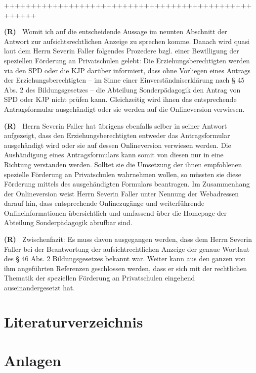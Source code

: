 \documentclass[paper=a4,fontsize=12pt, oneside, numbers=noenddot]{scrbook}
\newcounter{rz}
\newcommand{\Rz}{
	\addtocounter{rz}{1}\textbf{(R\arabic{rz})~}
}
\begin{document}
++++++++++++++++++++++++++++++++++++++++++++++++++++

\Rz Womit ich auf die entscheidende Aussage im neunten Abschnitt der Antwort zur aufsichtsrechtlichen Anzeige zu sprechen komme. Danach wird quasi laut dem Herrn Severin Faller folgendes Prozedere bzgl. einer Bewilligung der speziellen Förderung an Privatschulen gelebt: Die Erziehungsberechtigten werden via den SPD oder die KJP darüber informiert, dass ohne Vorliegen eines Antrags der Erziehungsberechtigten -- im Sinne einer Einverständniserklärung nach § 45 Abs. 2 des Bildungsgesetzes -- die Abteilung Sonderpädagogik den Antrag von SPD oder KJP nicht prüfen kann. Gleichzeitig wird ihnen das entsprechende Antragsformular ausgehändigt oder sie werden auf die Onlineversion verwiesen. 


\Rz Herrn Severin Faller hat übrigens ebenfalls selber in seiner Antwort aufgezeigt, dass den Erziehungsberechtigten entweder das Antragsformular ausgehändigt wird oder sie auf dessen Onlineversion verwiesen werden. Die Aushändigung eines Antragsformulars kann somit von diesen nur in eine Richtung verstanden werden. Solltet sie die Umsetzung der ihnen empfohlenen spezielle Förderung an Privatschulen wahrnehmen wollen, so müssten sie diese Förderung mittels des ausgehändigten Formulars beantragen. Im Zusammenhang der Onlineversion weist Herrn Severin Faller unter Nennung der Webadressen darauf hin, dass entsprechende Onlinezugänge und weiterführende Onlineinformationen übersichtlich und umfassend über die Homepage der Abteilung Sonderpädagogik abrufbar sind.


\Rz Zwischenfazit: Es muss davon ausgegangen werden, dass dem Herrn Severin Faller bei der Beantwortung der aufsichtrechtlichen Anzeige der genaue Wortlaut des § 46 Abs. 2 Bildungsgesetzes bekannt war. Weiter kann aus den ganzen von ihm angeführten Referenzen geschlossen werden, dass er sich mit der rechtlichen Thematik der speziellen Förderung an Privatschulen eingehend auseinandergesetzt hat. 


\chapter{Literaturverzeichnis}
\printbibliography[heading=none]

\chapter{Anlagen}\clearpage
\end{document}
